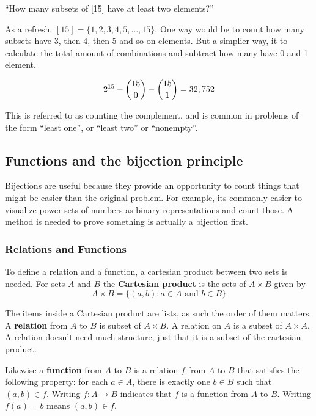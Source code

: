 \documentclass{article}
\begin{document}
\begin{center}
    ``How many subsets of [15] have at least two elements?''
\end{center}

As a refresh, $[15] = \{1, 2, 3, 4, 5, \dots, 15\}$. One way would be to count how many subsets have 3, then 4, then 5 and so on elements. But a simplier way, it to calculate the total amount of combinations and subtract how many have 0 and 1 element.

\begin{equation*}
    2^{15} - \dbinom{15}{0} - \dbinom{15}{1} = 32,752
\end{equation*}

This is referred to as counting the complement, and is common in problems of the form ``least one'', or ``least two'' or ``nonempty''.

\subsection{Functions and the bijection principle}

Bijections are useful because they provide an opportunity to count things that might be easier than the original problem. For example, its commonly easier to visualize power sets of numbers as binary representations and count those. A method is needed to prove something is actually a bijection first.

\subsubsection{Relations and Functions}

To define a relation and a function, a cartesian product between two sets is needed. For sets $A$ and $B$ the \textbf{Cartesian product} is the sets of $A \times B$ given by
\begin{equation*}
    A \times B = \{(a,b): a \in A \text{ and } b \in B\}
\end{equation*}

The items inside a Cartesian product are lists, as such the order of them matters. A \textbf{relation} from $A$ to $B$ is subset of $A \times B$. A relation on $A$ is a subset of $A \times A$. A relation doesn't need much structure, just that it is a subset of the cartesian product.\medskip

Likewise a \textbf{function} from $A$ to $B$ is a relation $f$ from $A$ to $B$ that satisfies the following property: for each $a \in A$, there is exactly one $b \in B$ such that $(a,b) \in f$. Writing $f: A \rightarrow B$ indicates that $f$ is a function from $A$ to $B$. Writing $f(a) = b$ means $(a,b) \in f$.\medskip
\end{document}
